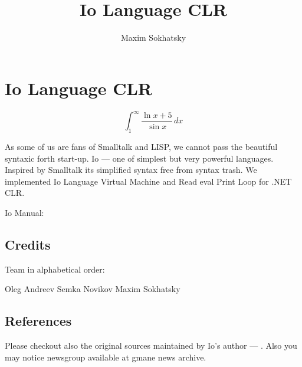 \documentclass[11pt]{article}
\begin{document}

\title{Io Language CLR}
\author{Maxim Sokhatsky}

\section*{Io Language CLR}

\begin{displaymath}
\int_1^\infty{\frac{\ln{x}+5}{\sin{x}}}\,dx
\end{displaymath}

As some of us are fans of Smalltalk and LISP, we cannot pass the 
beautiful syntaxic forth start-up. Io --- one of simplest but very powerful
languages. Inspired by Smalltalk its simplified syntax free from
syntax trash. We implemented Io Language Virtual Machine and Read
eval Print Loop for .NET CLR.

Io Manual: 

\subsection*{Credits}

Team in alphabetical order:

Oleg Andreev \@br
Semka Novikov \@br
Maxim Sokhatsky                                                                                                   

\subsection*{References}

Please checkout also the original  sources maintained by
Io's author --- . Also you may notice 
newsgroup available at gmane news archive.


\end{document}
